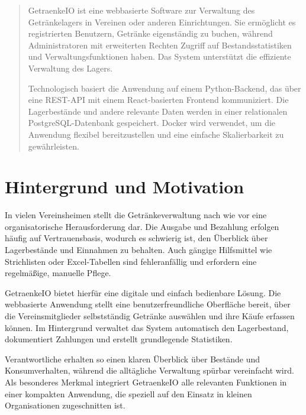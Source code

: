 \documentclass[conference,a4paper]{cs-techrep}
\begin{document}
\selectlanguage{\cstechrepLang}

\maketitle

\begin{abstract}
GetraenkeIO ist eine webbasierte Software zur Verwaltung des Getränkelagers in Vereinen oder anderen Einrichtungen. Sie ermöglicht es registrierten Benutzern, Getränke eigenständig zu buchen, während Administratoren mit erweiterten Rechten Zugriff auf Bestandsstatistiken und Verwaltungsfunktionen haben. Das System unterstützt die effiziente Verwaltung des Lagers.

Technologisch basiert die Anwendung auf einem Python-Backend, das über eine REST-API mit einem React-basierten Frontend kommuniziert. Die Lagerbestände und andere relevante Daten werden in einer relationalen PostgreSQL-Datenbank gespeichert. Docker wird verwendet, um die Anwendung flexibel bereitzustellen und eine einfache Skalierbarkeit zu gewährleisten.
\end{abstract}


\section{Hintergrund und Motivation}

In vielen Vereinsheimen stellt die Getränkeverwaltung nach wie vor eine organisatorische Herausforderung dar. Die Ausgabe und Bezahlung erfolgen häufig auf Vertrauensbasis, wodurch es schwierig ist, den Überblick über Lagerbestände und Einnahmen zu behalten. Auch gängige Hilfsmittel wie Strichlisten oder Excel-Tabellen sind fehleranfällig und erfordern eine regelmäßige, manuelle Pflege.

GetraenkeIO bietet hierfür eine digitale und einfach bedienbare Lösung. Die webbasierte Anwendung stellt eine benutzerfreundliche Oberfläche bereit, über die Vereinsmitglieder selbstständig Getränke auswählen und ihre Käufe erfassen können. Im Hintergrund verwaltet das System automatisch den Lagerbestand, dokumentiert Zahlungen und erstellt grundlegende Statistiken.

Verantwortliche erhalten so einen klaren Überblick über Bestände und Konsumverhalten, während die alltägliche Verwaltung spürbar vereinfacht wird. Als besonderes Merkmal integriert GetraenkeIO alle relevanten Funktionen in einer kompakten Anwendung, die speziell auf den Einsatz in kleinen Organisationen zugeschnitten ist.
\end{document}
